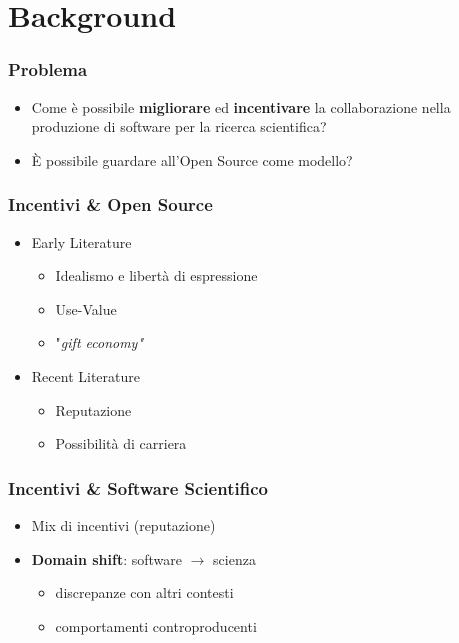 \section{Background}

\begin{frame}\frametitle{Problema}

\begin{itemize}[<+->]
\item
  Come è possibile \textbf{migliorare} ed \textbf{incentivare} la
  collaborazione nella produzione di software per la ricerca
  scientifica?
\item
  È possibile guardare all'Open Source come modello?
\end{itemize}

\end{frame}

\begin{frame}\frametitle{Incentivi \& Open Source}

\begin{itemize}[<+->]
\itemsep1pt\parskip0pt
\item
  Early Literature

  \begin{itemize}[<+->]
  \itemsep1pt\parskip0pt
  \item
    Idealismo e libertà di espressione
  \item
    Use-Value
  \item
    "\em{gift economy}"
  \end{itemize}
\item
  Recent Literature

  \begin{itemize}[<+->]
  \itemsep1pt\parskip0pt
  \item
    Reputazione
  \item
    Possibilità di carriera
  \end{itemize}
\end{itemize}

\end{frame}

\begin{frame}\frametitle{Incentivi \& Software Scientifico}

\begin{itemize}[<+->]
\itemsep1pt\parskip0pt
\item
  Mix di incentivi (reputazione)
\item
  \textbf{Domain shift}: software $\rightarrow$ scienza

  \begin{itemize}[<+->]
  \itemsep1pt\parskip0pt
  \item
    discrepanze con altri contesti
  \item
    comportamenti controproducenti
  \end{itemize}
\end{itemize}

\end{frame}

